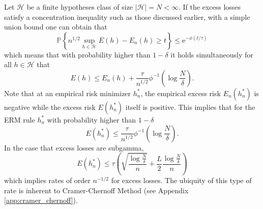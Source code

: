 \documentclass{uvamath}
\newcommand*{\calH}{\mathcal{H}}
\newcommand*{\prob}[2][]{\mathbb{P}_{#1}\left\{#2\right\}}
\newcommand*{\paren}[1]{\left(#1\right)}
\newcommand*{\rme}{\mathrm{e}}
\theoremstyle{remark}
\theoremstyle{definition}
\theoremstyle{definition}
\theoremstyle{definition}
\theoremstyle{definition}
\theoremstyle{definition}
\begin{document}
Let $\calH$ be a finite hypotheses class of size $|\calH| = N<\infty$.
If the excess losses satisfy a concentration inequality such as those
discussed earlier, with a simple union bound one can obtain that
\begin{equation*}
  \prob{n^{1/2}\sup_{h\in\calH}E(h) - E_n(h) \geq t}
  \leq\rme^{-\phi(t/\tau)}
\end{equation*}
which means that with probability higher than $1-\delta$ it holds
simultaneously for all $h\in\calH$ that
\begin{equation*}
  E(h) \leq  E_n(h) + \frac{\tau}{n^{1/2}}\phi^{-1}\paren{\log\frac{N}{\delta}}.
\end{equation*}
Note that at an empirical risk minimizer $h^*_n$, the empirical excess
risk $E_n(h^*_n)$ is negative while the excess risk $E(h^*_n)$ itself
is positive. This implies that for the ERM rule $h^*_n$ with
probability higher than $1-\delta$
\begin{equation*}
  E(h^*_n) \leq  \frac{\tau}{n^{1/2}}\phi^{-1}\paren{\log\frac{N}{\delta}}.
\end{equation*}
In the case that excess losses are subgamma,
\begin{equation*}
  E(h^*_n) \leq  \tau\paren{\sqrt{\frac{\log\frac{N}{\delta}}{n}} + \frac{L}{2}\frac{\log\frac{N}{\delta}}{n}}
\end{equation*}
which implies rates of order $n^{-1/2}$ for excess losses. The
ubiquity of this type of rate is inherent to Cramer-Chernoff Method
(see Appendix \ref{app:cramer_chernoff}).
\end{document}
